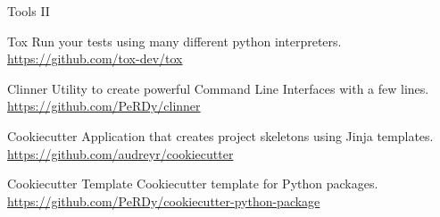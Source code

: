 \begin{frame}{Tools II}
    \begin{block}{Tox}
        Run your tests using many different python interpreters.
        \href{https://github.com/tox-dev/tox}{https://github.com/tox-dev/tox}
    \end{block}
    \pause
    \begin{block}{Clinner}
        Utility to create powerful Command Line Interfaces with a few lines.
        \href{https://github.com/PeRDy/clinner}{https://github.com/PeRDy/clinner}
    \end{block}
    \pause
    \begin{block}{Cookiecutter}
        Application that creates project skeletons using Jinja templates.
        \href{https://github.com/audreyr/cookiecutter}{https://github.com/audreyr/cookiecutter}
    \end{block}
    \pause
    \begin{block}{Cookiecutter Template}
        Cookiecutter template for Python packages.
        \href{https://github.com/PeRDy/cookiecutter-python-package}{https://github.com/PeRDy/cookiecutter-python-package}
    \end{block}
\end{frame}

